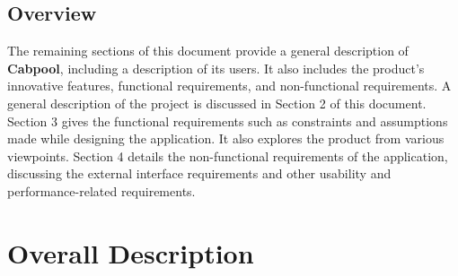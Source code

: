 \documentclass[english]{article}
\begin{document}

\subsection{Overview}
\label{sub:overview}
The remaining sections of this document provide a general description of \textbf{Cabpool}, including a description of its users. It also includes the product's innovative features, functional requirements, and non-functional requirements. A general description of the project is discussed in Section 2 of this document. Section 3 gives the functional requirements such as constraints and assumptions made while designing the application. It also explores the product from various viewpoints. Section 4 details the non-functional requirements of the application, discussing the external interface requirements and other usability and performance-related requirements.


\section{Overall Description}
\label{sec:overall_description}
\end{document}
